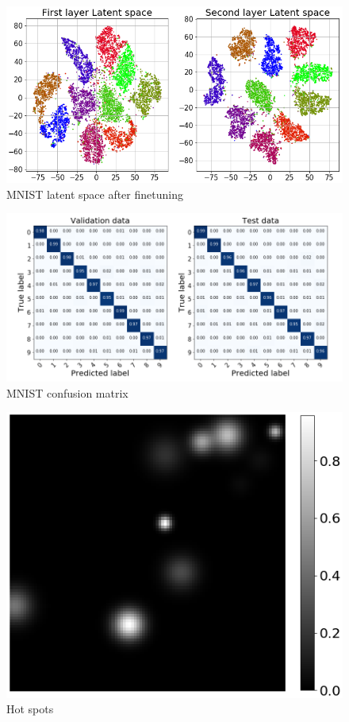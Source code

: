 \documentclass{article}
\begin{document}
\begin{figure}[H]
	\centering
	\includegraphics[width=1\linewidth]{latent_space_finetune_no_legend.png}  
	\caption{MNIST latent space after finetuning}
\end{figure}


\begin{figure}[H]
	\includegraphics[width=1\linewidth]{Confusion_matrix_fine_tune_2.png}  
	\caption{MNIST confusion matrix}
\end{figure}

\begin{figure}[H]
    \centering
	\includegraphics[width=0.5\linewidth]{raman_sim_hotspots.png}  
	\caption{Hot spots}
	\label{fig:hotspots}
\end{figure}
\end{document}
